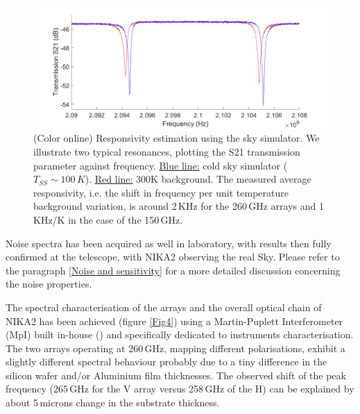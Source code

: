 \documentclass[]{aa} %
\begin{document}
\begin{figure}[h]
\begin{center}
   \centering
    \includegraphics[width=1.05\linewidth]{Shift_f_260GHz.png}
    \caption{(Color online) Responsivity estimation using the sky simulator. We illustrate two typical resonances, plotting the S21 transmission parameter against frequency. \underline{Blue line:} cold sky simulator ($T_{SS} \sim 100\,K$). \underline{Red line:} 300K background. The measured average responsivity, i.e. the shift in frequency per unit temperature background variation, is around 2\,KHz for the 260\,GHz arrays and 1\,KHz/K in the case of the 150\,GHz.}
         \label{Shift_f}
\end{center}
\end{figure}

Noise spectra has been acquired as well in laboratory, with results then fully confirmed at the telescope, with NIKA2 observing the real Sky. Please refer to the paragraph \ref{Noise and sensitivity} for a more detailed discussion concerning the noise properties. 

The spectral characterisation of the arrays and the overall optical chain of NIKA2 has been achieved (figure \ref{Fig4}) using a Martin-Puplett Interferometer (MpI) built in-house (\cite{Durand2008}) and specifically dedicated to instruments characterisation. The two arrays operating at 260\,GHz, mapping different polarisations, exhibit a slightly different spectral behaviour probably due to a tiny difference in the silicon wafer and/or Aluminium film thicknesses. The observed shift of the peak frequency (265\,GHz for the V array versus 258\,GHz of the H) can be explained by about 5\,microns change in the substrate thickness.
\end{document}
